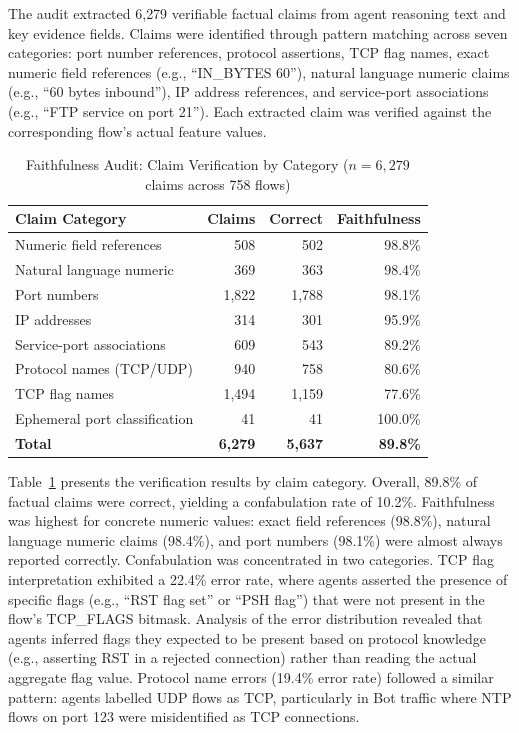 \documentclass[../main.tex]{subfiles}
\begin{document}
The audit extracted 6{,}279 verifiable factual claims from agent reasoning text and key evidence fields. Claims were identified through pattern matching across seven categories: port number references, protocol assertions, TCP flag names, exact numeric field references (e.g., ``IN\_BYTES 60''), natural language numeric claims (e.g., ``60 bytes inbound''), IP address references, and service-port associations (e.g., ``FTP service on port 21''). Each extracted claim was verified against the corresponding flow's actual feature values.

\begin{table}[H]
\centering
\caption{Faithfulness Audit: Claim Verification by Category ($n = 6{,}279$ claims across 758 flows)}
\label{tab:faithfulness-claims}
\small
\begin{tabular}{l r r r}
\toprule
Claim Category & Claims & Correct & Faithfulness \\
\midrule
Numeric field references & 508 & 502 & 98.8\% \\
Natural language numeric & 369 & 363 & 98.4\% \\
Port numbers & 1{,}822 & 1{,}788 & 98.1\% \\
IP addresses & 314 & 301 & 95.9\% \\
Service-port associations & 609 & 543 & 89.2\% \\
Protocol names (TCP/UDP) & 940 & 758 & 80.6\% \\
TCP flag names & 1{,}494 & 1{,}159 & 77.6\% \\
Ephemeral port classification & 41 & 41 & 100.0\% \\
\midrule
\textbf{Total} & \textbf{6{,}279} & \textbf{5{,}637} & \textbf{89.8\%} \\
\bottomrule
\end{tabular}
\end{table}

Table~\ref{tab:faithfulness-claims} presents the verification results by claim category. Overall, 89.8\% of factual claims were correct, yielding a confabulation rate of 10.2\%. Faithfulness was highest for concrete numeric values: exact field references (98.8\%), natural language numeric claims (98.4\%), and port numbers (98.1\%) were almost always reported correctly. Confabulation was concentrated in two categories. TCP flag interpretation exhibited a 22.4\% error rate, where agents asserted the presence of specific flags (e.g., ``RST flag set'' or ``PSH flag'') that were not present in the flow's TCP\_FLAGS bitmask. Analysis of the error distribution revealed that agents inferred flags they expected to be present based on protocol knowledge (e.g., asserting RST in a rejected connection) rather than reading the actual aggregate flag value. Protocol name errors (19.4\% error rate) followed a similar pattern: agents labelled UDP flows as TCP, particularly in Bot traffic where NTP flows on port 123 were misidentified as TCP connections.
\end{document}
